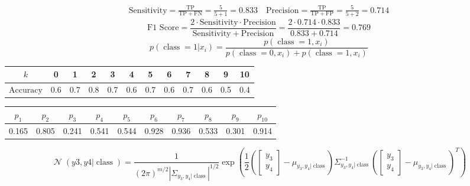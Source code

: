 \documentclass{article}
\DeclareMathOperator*{\class}{class}
\DeclareMathOperator*{\normal}{\mathcal{N}}
\begin{document}
    \begin{gather*}
        \mathrm{Sensitivity} = \frac{\mathrm{TP}}{\mathrm{TP} + \mathrm{FN}} = \frac{5}{5 + 1} = 0.833  \quad \mathrm{Precision} = \frac{\mathrm{TP}}{\mathrm{TP} + \mathrm{FP}} = \frac{5}{5 + 2} = 0.714
    \end{gather*}
    \begin{equation*}
        \text{F1 Score} =  \frac{2 \cdot \mathrm{Sensitivity} \cdot \mathrm{Precision}}{\mathrm{Sensitivity + Precision}} = \frac{2 \cdot 0.714 \cdot 0.833}{0.833 + 0.714} = 0.769
    \end{equation*}
    \begin{equation*}
        p(\class = 1 | x_i) = \frac{p(\class = 1, x_i)}{p(\class = 0,  x_i) + p(\class = 1, x_i)}
    \end{equation*}
    \begin{table}[H]
        \begin{tabular}{c|c|c|c|c|c|c|c|c|c|c|c}
        $k$                 & 0   & 1   & 2   & 3   & 4   & 5   & 6   & 7   & 8   & 9   & 10  \\ \hline
        $\mathrm{Accuracy}$ & 0.6 & 0.7 & 0.8 & 0.7 & 0.6 & 0.7 & 0.6 & 0.7 & 0.6 & 0.5 & 0.4
        \end{tabular}
    \end{table}
    \begin{table}[H]
        \begin{tabular}{c|c|c|c|c|c|c|c|c|c}
        $p_1$ & $p_2$ & $p_3$ & $p_4$ & $p_5$ & $p_6$ & $p_7$ & $p_8$ & $p_9$ & $p_{10}$ \\ \hline
        0.165                       & 0.805                       & 0.241                       & 0.541                       & 0.544                       & 0.928                       & 0.936                       & 0.533                       & 0.301                       & 0.914                       
        \end{tabular}
    \end{table}
    \begin{equation*}
        \normal({y3, y4|\class}) = \frac{1}{(2\pi)^{m / 2}|\Sigma_{y_3, y_4|\class}|^{1/2}}\exp\left(\frac{1}{2}\left(
            \begin{bmatrix}
                y_3 \\ y_4
            \end{bmatrix} - \mu_{y_3, y_4|\class}\right)\Sigma_{y_3, y_4|\class}^{-1}\left(
                \begin{bmatrix}
                    y_3 \\ y_4
                \end{bmatrix} - \mu_{y_3, y_4|\class}\right)^T \right)
    \end{equation*}
\end{document}
